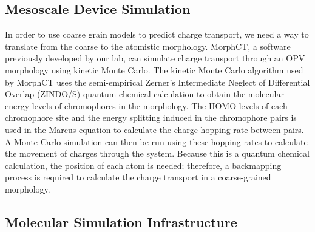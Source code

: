
\subsection*{Mesoscale Device Simulation}

In order to use coarse grain models to predict charge transport, we need a way to translate from the coarse to the atomistic morphology.
MorphCT, a software previously developed by our lab, can simulate charge transport through an OPV morphology using kinetic Monte Carlo\cite{Miller2018a,MorphCT,morphct2.2}.
The kinetic Monte Carlo algorithm used by MorphCT uses the semi-empirical Zerner's Intermediate Neglect of Differential Overlap (ZINDO/S) quantum chemical calculation to obtain the molecular energy levels of chromophores in the morphology.
The HOMO levels of each chromophore site and the energy splitting induced in the chromophore pairs is used in the Marcus equation to calculate the charge hopping rate between pairs.
A Monte Carlo simulation can then be run using these hopping rates to calculate the movement of charges through the system.
Because this is a quantum chemical calculation, the position of each atom is needed; therefore, a backmapping process is required to calculate the charge transport in a coarse-grained morphology.

\subsection*{Molecular Simulation Infrastructure}

